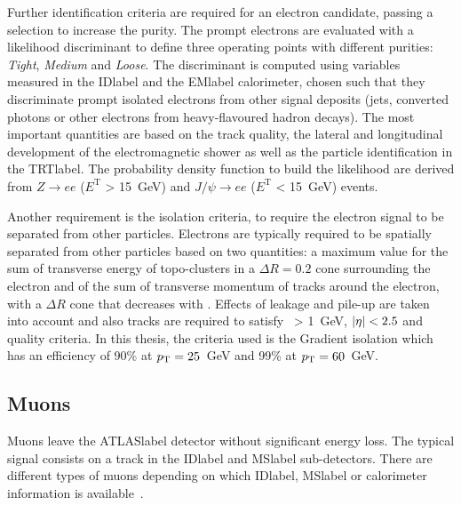 Further identification criteria are required for an electron candidate, passing a selection to increase the purity. The prompt electrons are evaluated with a likelihood discriminant to define three operating points with different purities: \textit{Tight}, \textit{Medium} and \textit{Loose}. The discriminant is computed using variables measured in the \acrshort{IDlabel} and the \acrshort{EMlabel} calorimeter, chosen such that they discriminate prompt isolated electrons from other signal deposits (jets, converted photons or other electrons from heavy-flavoured hadron decays). The most important quantities are based on the track quality, the lateral and longitudinal development of the electromagnetic shower as well as the particle identification in the \acrshort{TRTlabel}. The probability density function to build the likelihood are derived from $Z\rightarrow ee$ ($E^\text{T}$ > 15~GeV) and $J/\psi \rightarrow ee$ ($E^\text{T}$ < 15~GeV) events.

Another requirement is the isolation criteria, to require the electron signal to be separated from other particles. Electrons are typically required to be spatially separated from other particles based on two quantities: a maximum value for the sum of transverse energy of topo-clusters in a $\Delta R=0.2$ cone surrounding the electron and of the sum of transverse momentum of tracks around the electron, with a $\Delta R$ cone that decreases with \pT. Effects of leakage and pile-up are taken into account and also tracks are required to satisfy \pT\ > 1~GeV, $\abs{\eta}<2.5$ and quality criteria. In this thesis, the criteria used is the Gradient isolation which has an efficiency of 90\% at $p_{\text{T}} = 25$~GeV and 99\% at $p_{\text{T}} = 60$~GeV.

\subsection{Muons}

Muons leave the \acrshort{ATLASlabel} detector without significant energy loss. The typical signal consists on a track in the \acrshort{IDlabel} and \acrshort{MSlabel} sub-detectors. There are different types of muons depending on which \acrshort{IDlabel}, \acrshort{MSlabel} or calorimeter information is available~\cite{performancemu}.

